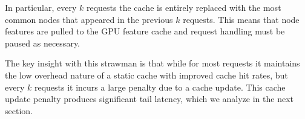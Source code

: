 In particular, every $k$ requests the cache is entirely replaced with the most common nodes that appeared in the previous $k$ requests. This means that node features are pulled to the GPU feature cache and request handling must be paused as necessary. 

The key insight with this strawman is that while for most requests it maintains the low overhead nature of a static cache with improved cache hit rates, but every $k$ requests it incurs a large penalty due to a cache update. This cache update penalty produces significant tail latency, which we analyze in the next section.




